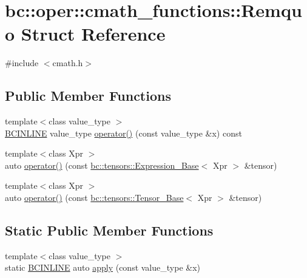 \hypertarget{structbc_1_1oper_1_1cmath__functions_1_1Remquo}{}\section{bc\+:\+:oper\+:\+:cmath\+\_\+functions\+:\+:Remquo Struct Reference}
\label{structbc_1_1oper_1_1cmath__functions_1_1Remquo}


{\ttfamily \#include $<$cmath.\+h$>$}

\subsection*{Public Member Functions}
\begin{DoxyCompactItemize}
\item 
{\footnotesize template$<$class value\+\_\+type $>$ }\\\hyperlink{common_8h_a6699e8b0449da5c0fafb878e59c1d4b1}{B\+C\+I\+N\+L\+I\+NE} value\+\_\+type \hyperlink{structbc_1_1oper_1_1cmath__functions_1_1Remquo_a839e6c3319227cd9a2ac070f6355d82f}{operator()} (const value\+\_\+type \&x) const
\item 
{\footnotesize template$<$class Xpr $>$ }\\auto \hyperlink{structbc_1_1oper_1_1cmath__functions_1_1Remquo_a5e851d9c26d2c5bcf525e77dd626537b}{operator()} (const \hyperlink{classbc_1_1tensors_1_1Expression__Base}{bc\+::tensors\+::\+Expression\+\_\+\+Base}$<$ Xpr $>$ \&tensor)
\item 
{\footnotesize template$<$class Xpr $>$ }\\auto \hyperlink{structbc_1_1oper_1_1cmath__functions_1_1Remquo_a1f4d2e215620347cee0d47ab67d5c52f}{operator()} (const \hyperlink{classbc_1_1tensors_1_1Tensor__Base}{bc\+::tensors\+::\+Tensor\+\_\+\+Base}$<$ Xpr $>$ \&tensor)
\end{DoxyCompactItemize}
\subsection*{Static Public Member Functions}
\begin{DoxyCompactItemize}
\item 
{\footnotesize template$<$class value\+\_\+type $>$ }\\static \hyperlink{common_8h_a6699e8b0449da5c0fafb878e59c1d4b1}{B\+C\+I\+N\+L\+I\+NE} auto \hyperlink{structbc_1_1oper_1_1cmath__functions_1_1Remquo_a25ae56dde322f06a02b4f695ae5a1a0d}{apply} (const value\+\_\+type \&x)
\end{DoxyCompactItemize}


